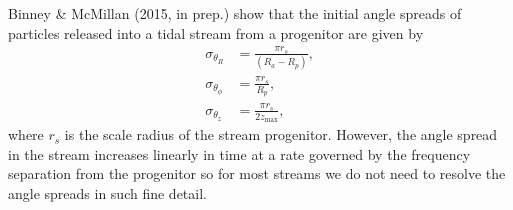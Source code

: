 \documentclass[useAMS,usenatbib,fleqn,a4paper]{mn2e}
\begin{document}
Binney \& McMillan (2015, in prep.) show that the initial angle spreads of particles released into a tidal stream from a progenitor are given by
\begin{equation}
\begin{split}
\sigma_{\theta_R} &= \frac{\pi r_s}{(R_a-R_p)},\\
\sigma_{\theta_\phi} &= \frac{\pi r_s}{R_p},\\
\sigma_{\theta_z} &= \frac{\pi r_s}{2 z_\mathrm{max}},
\end{split}
\end{equation}
where $r_s$ is the scale radius of the stream progenitor. However, the angle spread in the stream increases linearly in time at a rate governed by the frequency separation from the progenitor so for most streams we do not need to resolve the angle spreads in such fine detail.

\label{lastpage}
\end{document}
